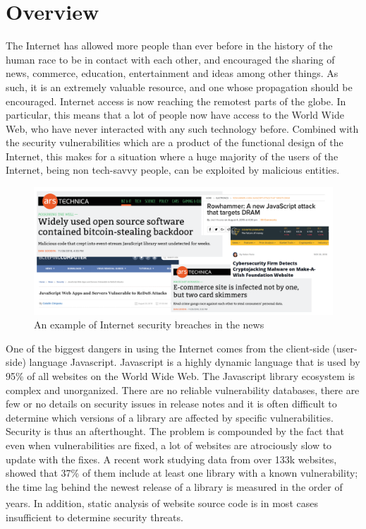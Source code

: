 \section{Overview}
The Internet has allowed more people than ever before in the history of the human race to be in contact with each other, and encouraged the sharing of news, commerce, education, entertainment and ideas among other things. As such, it is an extremely valuable resource, and one whose propagation should be encouraged. Internet access is now reaching the remotest parts of the globe. In particular, this means that a lot of people now have access to the World Wide Web, who have never interacted with any such technology before. Combined with the security vulnerabilities which are a product of the functional design of the Internet, this makes for a situation where a huge majority of the users of the Internet, being non tech-savvy people, can be exploited by malicious entities.

\begin{figure}
\centering
\includegraphics[width=1.0\textwidth]{images/news.png}
\caption{\label{fig:news} An example of Internet security breaches in the news}
\end{figure}


One of the biggest dangers in using the Internet comes from the client-side (user-side) language Javascript. Javascript is a highly dynamic language that is used by 95\% of all websites on the World Wide Web. The Javascript library ecosystem is complex and unorganized. There are no reliable vulnerability databases, there are few or no details on security issues in release notes and it is often difficult to determine which versions of a library are affected by specific vulnerabilities. Security is thus an afterthought. The problem is compounded by the fact that even when vulnerabilities are fixed, a lot of websites are atrociously slow to update with the fixes. A recent work studying data from over 133k websites, showed that 37\% of them include at least one library with a known vulnerability; the time lag behind the newest release of a library is measured in the order of years\textsuperscript{\cite{LauingerCA0WK17}}. In addition, static analysis of website source code is in most cases insufficient to determine security threats.

